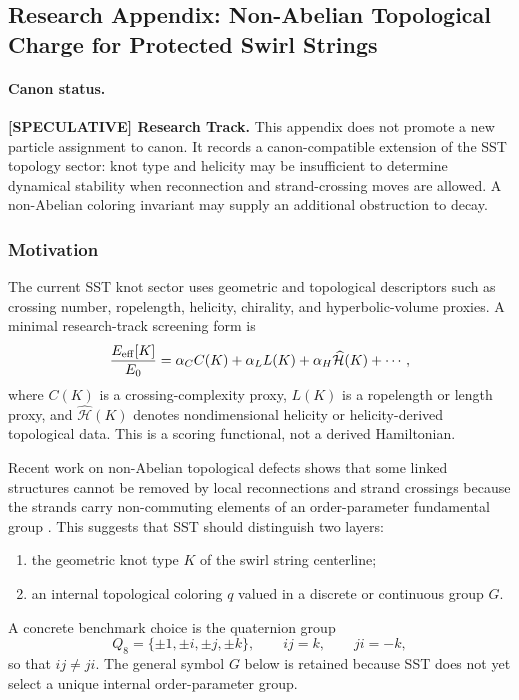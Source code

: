 \subsection{Research Appendix: Non-Abelian Topological Charge for Protected Swirl Strings}
\label{app:nonabelian_topological_charge}

\paragraph{Canon status.}
\textbf{[SPECULATIVE] Research Track.}
This appendix does not promote a new particle assignment to canon. It records a canon-compatible extension of the SST topology sector: knot type and helicity may be insufficient to determine dynamical stability when reconnection and strand-crossing moves are allowed. A non-Abelian coloring invariant may supply an additional obstruction to decay.

\subsubsection{Motivation}
The current SST knot sector uses geometric and topological descriptors such as crossing number, ropelength, helicity, chirality, and hyperbolic-volume proxies. A minimal research-track screening form is
\begin{equation}
    \frac{E_{\rm eff}[K]}{E_0}
    =\alpha_C C(K)+\alpha_L L(K)+\alpha_H\widehat{\mathcal H}(K)+\cdots,
    \label{eq:sst_eff_energy_old}
\end{equation}
where $C(K)$ is a crossing-complexity proxy, $L(K)$ is a ropelength or length proxy, and $\widehat{\mathcal H}(K)$ denotes nondimensional helicity or helicity-derived topological data.  This is a scoring functional, not a derived Hamiltonian.

Recent work on non-Abelian topological defects shows that some linked structures cannot be removed by local reconnections and strand crossings because the strands carry non-commuting elements of an order-parameter fundamental group \cite{Annala2022ProtectedVortexKnots}. This suggests that SST should distinguish two layers:
\begin{enumerate}
    \item the geometric knot type $K$ of the swirl string centerline;
    \item an internal topological coloring $q$ valued in a discrete or continuous group $G$.
\end{enumerate}

A concrete benchmark choice is the quaternion group
\begin{equation}
    Q_8=\{\pm 1,\pm i,\pm j,\pm k\},
    \qquad ij=k,
    \qquad ji=-k,
\end{equation}
so that $ij\neq ji$.  The general symbol $G$ below is retained because SST does not yet select a unique internal order-parameter group.

